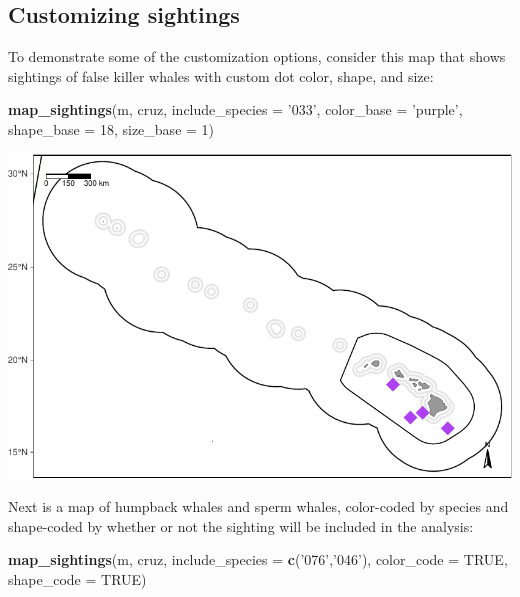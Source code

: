 \documentclass[
]{book}
\newenvironment{Shaded}{\begin{snugshade}}{\end{snugshade}}
\newcommand{\DataTypeTok}[1]{\textcolor[rgb]{0.13,0.29,0.53}{#1}}
\newcommand{\DecValTok}[1]{\textcolor[rgb]{0.00,0.00,0.81}{#1}}
\newcommand{\KeywordTok}[1]{\textcolor[rgb]{0.13,0.29,0.53}{\textbf{#1}}}
\newcommand{\NormalTok}[1]{#1}
\newcommand{\OtherTok}[1]{\textcolor[rgb]{0.56,0.35,0.01}{#1}}
\newcommand{\StringTok}[1]{\textcolor[rgb]{0.31,0.60,0.02}{#1}}
\begin{document}
\hypertarget{customizing-sightings}{%
\subsection*{Customizing sightings}\label{customizing-sightings}}

To demonstrate some of the customization options, consider this map that shows sightings of false killer whales with custom dot color, shape, and size:

\begin{Shaded}
\begin{Highlighting}[]
\KeywordTok{map_sightings}\NormalTok{(m,}
\NormalTok{              cruz,}
              \DataTypeTok{include_species =} \StringTok{'033'}\NormalTok{,}
              \DataTypeTok{color_base =} \StringTok{'purple'}\NormalTok{,}
              \DataTypeTok{shape_base =} \DecValTok{18}\NormalTok{,}
              \DataTypeTok{size_base =} \DecValTok{1}\NormalTok{)}
\end{Highlighting}
\end{Shaded}

\includegraphics{figures/unnamed-chunk-62-1.pdf}

Next is a map of humpback whales and sperm whales, color-coded by species and shape-coded by whether or not the sighting will be included in the analysis:

\begin{Shaded}
\begin{Highlighting}[]
\KeywordTok{map_sightings}\NormalTok{(m, }
\NormalTok{              cruz,}
              \DataTypeTok{include_species =} \KeywordTok{c}\NormalTok{(}\StringTok{'076'}\NormalTok{,}\StringTok{'046'}\NormalTok{),}
              \DataTypeTok{color_code =} \OtherTok{TRUE}\NormalTok{,}
              \DataTypeTok{shape_code =} \OtherTok{TRUE}\NormalTok{)}
\end{Highlighting}
\end{Shaded}
\end{document}
